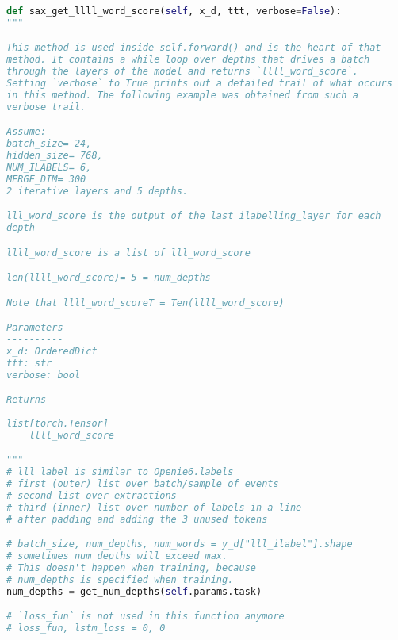 \documentclass[12pt]{article}
\begin{document}
\begin{lstlisting}[language=Python]
def sax_get_llll_word_score(self, x_d, ttt, verbose=False):
"""

This method is used inside self.forward() and is the heart of that
method. It contains a while loop over depths that drives a batch
through the layers of the model and returns `llll_word_score`.
Setting `verbose` to True prints out a detailed trail of what occurs
in this method. The following example was obtained from such a
verbose trail.

Assume:
batch_size= 24,
hidden_size= 768,
NUM_ILABELS= 6,
MERGE_DIM= 300
2 iterative layers and 5 depths.

lll_word_score is the output of the last ilabelling_layer for each
depth

llll_word_score is a list of lll_word_score

len(llll_word_score)= 5 = num_depths

Note that llll_word_scoreT = Ten(llll_word_score)

Parameters
----------
x_d: OrderedDict
ttt: str
verbose: bool

Returns
-------
list[torch.Tensor]
    llll_word_score

"""
# lll_label is similar to Openie6.labels
# first (outer) list over batch/sample of events
# second list over extractions
# third (inner) list over number of labels in a line
# after padding and adding the 3 unused tokens

# batch_size, num_depths, num_words = y_d["lll_ilabel"].shape
# sometimes num_depths will exceed max.
# This doesn't happen when training, because
# num_depths is specified when training.
num_depths = get_num_depths(self.params.task)

# `loss_fun` is not used in this function anymore
# loss_fun, lstm_loss = 0, 0


\end{lstlisting}
\end{document}
